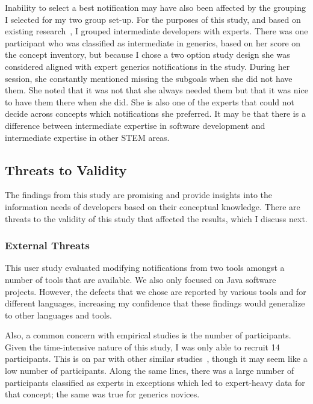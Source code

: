 Inability to select a best notification may have also been affected by the grouping I selected for my two group set-up. 
For the purposes of this study, and based on existing research~\cite{mckeithen1981knowledge}, I grouped intermediate developers with experts. 
There was one participant who was classified as intermediate in generics, based on her score on the concept inventory, but because I chose a two option study design she was considered aligned with expert generics notifications in the study.
During her session, she constantly mentioned missing the subgoals when she did not have them. She noted that it was not that she always needed them but that it was nice to have them there when she did. She is also one of the experts that could not decide across concepts which notifications she preferred. 
It may be that there is a difference between intermediate expertise in software development and intermediate expertise in other STEM areas.



\vspace{0.5em}
\vspace{0.5em}

\subsection{Threats to Validity}
The findings from this study are promising and provide insights into the information needs of developers based on their conceptual knowledge. There are threats to the validity of this study that affected the results, which I discuss next.

\subsubsection{External Threats}
This user study evaluated modifying notifications from two tools amongst a number of tools that are available.
We also only focused on Java software projects.
However, the defects that we chose are reported by various tools and for different languages, increasing my confidence that these findings would generalize to other languages and tools.

Also, a common concern with empirical studies is the number of participants. Given the time-intensive nature of this study, I was only able to recruit 14 participants. This is on par with other similar studies~\cite{smith2015questions,Layman:2007:FaultFix}, though it may seem like a low number of participants. 
Along the same lines, there was a large number of participants classified as experts in exceptions which led to expert-heavy data for that concept; the same was true for generics novices.


